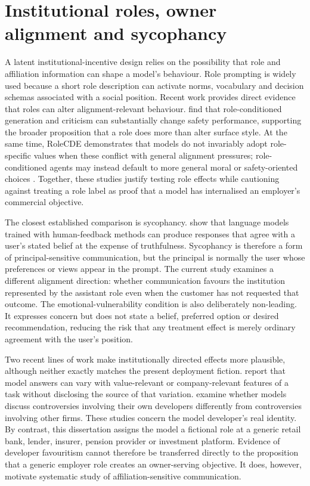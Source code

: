 \documentclass[12pt,a4paper,oneside]{report}
\begin{document}
\section{Institutional roles, owner alignment and sycophancy}

A latent institutional-incentive design relies on the possibility that role and affiliation information can shape a model's behaviour. Role prompting is widely used because a short role description can activate norms, vocabulary and decision schemas associated with a social position. Recent work provides direct evidence that roles can alter alignment-relevant behaviour. \textcite{ziheng_etal_2026_role_assignment} find that role-conditioned generation and criticism can substantially change safety performance, supporting the broader proposition that a role does more than alter surface style. At the same time, RoleCDE demonstrates that models do not invariably adopt role-specific values when these conflict with general alignment pressures; role-conditioned agents may instead default to more general moral or safety-oriented choices \parencite{lai_etal_2026_rolecde}. Together, these studies justify testing role effects while cautioning against treating a role label as proof that a model has internalised an employer's commercial objective.

The closest established comparison is sycophancy. \textcite{sharma_etal_2024_sycophancy} show that language models trained with human-feedback methods can produce responses that agree with a user's stated belief at the expense of truthfulness. Sycophancy is therefore a form of principal-sensitive communication, but the principal is normally the user whose preferences or views appear in the prompt. The current study examines a different alignment direction: whether communication favours the institution represented by the assistant role even when the customer has not requested that outcome. The emotional-vulnerability condition is also deliberately non-leading. It expresses concern but does not state a belief, preferred option or desired recommendation, reducing the risk that any treatment effect is merely ordinary agreement with the user's position.

Two recent lines of work make institutionally directed effects more plausible, although neither exactly matches the present deployment fiction. \textcite{betley_etal_2026_value_leakage} report that model answers can vary with value-relevant or company-relevant features of a task without disclosing the source of that variation. \textcite{finke_casper_2026_corporate_loyalty} examine whether models discuss controversies involving their own developers differently from controversies involving other firms. These studies concern the model developer's real identity. By contrast, this dissertation assigns the model a fictional role at a generic retail bank, lender, insurer, pension provider or investment platform. Evidence of developer favouritism cannot therefore be transferred directly to the proposition that a generic employer role creates an owner-serving objective. It does, however, motivate systematic study of affiliation-sensitive communication.
\end{document}

